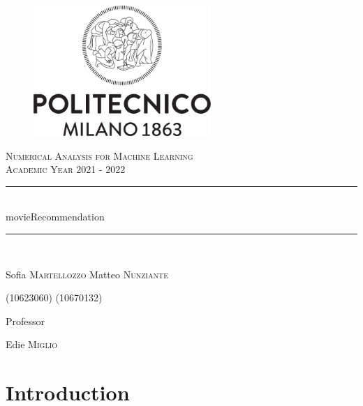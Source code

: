 \documentclass{article}
\begin{document}
\begin{titlepage}
      \centering
      \begin{figure}
            \begin{center}
                  \includegraphics[width=0.6\textwidth]{images/logo_polimi.png}
            \end{center}
      \end{figure}
      \vfill
      {\scshape\LARGE Numerical Analysis for Machine Learning\\Academic Year 2021 - 2022 \par}
      
      
      \vfill
      \newcommand{\HRule}{\rule{\linewidth}{0.3mm}}
      \centering
      \HRule \\[0.4cm]
      \huge  movieRecommendation\\%
      \HRule \\
      \vspace{1cm}
      {\Large Sofia \textsc{Martellozzo} \quad Matteo \textsc{Nunziante} \par}
      {\Large(10623060) \quad (10670132) \par}
      \vfill
      {\large Professor\par
          Edie \textsc{Miglio}}
\end{titlepage}


\newpage
\renewcommand\contentsname{Contents}
\tableofcontents

\newpage

\section{Introduction}
\end{document}
